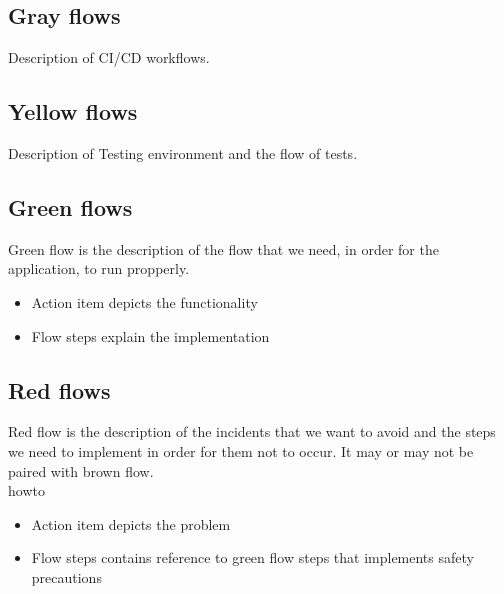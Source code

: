 \subsection{Gray flows}\label{philo:gray:flow}
Description of CI/CD workflows.
\subsection{Yellow flows}\label{philo:Yellow:flow}
Description of Testing environment and the flow of tests.
\subsection{Green flows}\label{philo:green:flow}
Green flow is the description of the flow that we need, in order for the application, to run propperly. 
\begin{itemize}
  \item Action item depicts the functionality 
  \item Flow steps explain the implementation
\end{itemize}
\subsection{Red flows}\label{philo:red:flow}
Red flow is the description of the incidents that we want to avoid and the steps we need to implement in order for them not to occur. It may or may not be paired with brown flow.\\
howto
\begin{itemize}
  \item Action item depicts the problem 
  \item Flow steps contains reference to green flow steps that implements safety precautions
\end{itemize}
